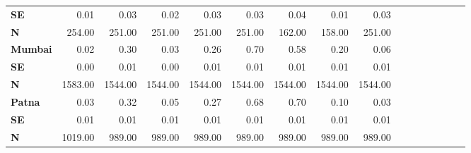 \begin{tabular}{@{\extracolsep{5pt}}lrrrrrrrrrrrrrrr}
{\bf SE} & 0.01\phantom{***} & 0.03\phantom{***} & 0.02\phantom{***} & 0.03\phantom{***} & 0.03\phantom{***} & 0.04\phantom{***} & 0.01\phantom{***} & 0.03\phantom{***} \\
{\bf N} & 254.00\phantom{***} & 251.00\phantom{***} & 251.00\phantom{***} & 251.00\phantom{***} & 251.00\phantom{***} & 162.00\phantom{***} & 158.00\phantom{***} & 251.00\phantom{***} \\
{\bf Mumbai} & 0.02\phantom{***} & 0.30\phantom{***} & 0.03\phantom{***} & 0.26\phantom{***} & 0.70\phantom{***} & 0.58\phantom{***} & 0.20\phantom{***} & 0.06\phantom{***} \\
{\bf SE} & 0.00\phantom{***} & 0.01\phantom{***} & 0.00\phantom{***} & 0.01\phantom{***} & 0.01\phantom{***} & 0.01\phantom{***} & 0.01\phantom{***} & 0.01\phantom{***} \\
{\bf N} & 1583.00\phantom{***} & 1544.00\phantom{***} & 1544.00\phantom{***} & 1544.00\phantom{***} & 1544.00\phantom{***} & 1544.00\phantom{***} & 1544.00\phantom{***} & 1544.00\phantom{***} \\
{\bf Patna} & 0.03\phantom{***} & 0.32\phantom{***} & 0.05\phantom{***} & 0.27\phantom{***} & 0.68\phantom{***} & 0.70\phantom{***} & 0.10\phantom{***} & 0.03\phantom{***} \\
{\bf SE} & 0.01\phantom{***} & 0.01\phantom{***} & 0.01\phantom{***} & 0.01\phantom{***} & 0.01\phantom{***} & 0.01\phantom{***} & 0.01\phantom{***} & 0.01\phantom{***} \\
{\bf N} & 1019.00\phantom{***} & 989.00\phantom{***} & 989.00\phantom{***} & 989.00\phantom{***} & 989.00\phantom{***} & 989.00\phantom{***} & 989.00\phantom{***} & 989.00\phantom{***} \\
\hline
\end{tabular}
